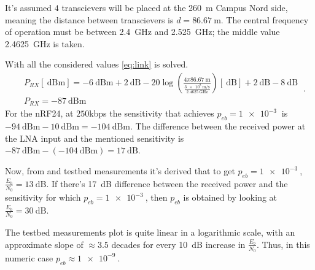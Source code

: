 It's assumed $4$ transcievers will be placed at the \SI{260}{\m} Campus Nord side, meaning the distance between transcievers is $d = \SI{86.67}{\m}$. The central frequency of operation must be between \SI{2.4}{\GHz} and \SI{2.525}{\GHz}; the middle value \SI{2.4625}{\GHz} is taken.

With all the considered values \eqref{eq:link} is solved.
\begin{equation}
	\begin{split}
		& P_{RX} \left[ \SI{}{\dB}\text{m} \right] = \SI{-6}{\dB}\text{m} +  \SI{2}{\dB}  - 20 \log\left( \frac{4 \pi \SI{86.67}{\m}}{\frac{\SI{3e8}{\m\per\s}}{\SI{2.4625}{\GHz}}} \right) \left[ \SI{}{\dB} \right] + \SI{2}{\dB} - \SI{8}{\dB} \\
		& P_{RX} = - \SI{87}{\dB}\text{m}
	\end{split} \ .
\end{equation}
For the nRF24, at $250$kbps the sensitivity that achieves $p_{eb} = \SI{1e-3}{}$ is $- \SI{94}{\dB}\text{m} - \SI{10}{\dB}\text{m} = - \SI{104}{\dB}\text{m}$. The difference between the received power at the LNA input and the mentioned sensitivity is $- \SI{87}{\dB}\text{m} - \left( - \SI{104}{\dB}\text{m} \right) = \SI{17}{\dB}$.

Now, from  and testbed measurements it's derived that to get $p_{eb} = \SI{1e-3}{}$, $\frac{E_b}{N_0} = \SI{13}{\dB}$. If there's \SI{17}{\dB} difference between the received power and the sensitivity for which $p_{eb} = \SI{1e-3}{}$, then $p_{eb}$ is obtained by looking at $\frac{E_b}{N_0} = \SI{30}{\dB}$. 

The testbed measurements plot is quite linear in a logarithmic scale, with an approximate slope of $\approx 3.5$ decades for every \SI{10}{\dB} increase in $\frac{E_b}{N_0}$. Thus, in this numeric case $p_{eb} \approx \SI{1e-9}{}$.


